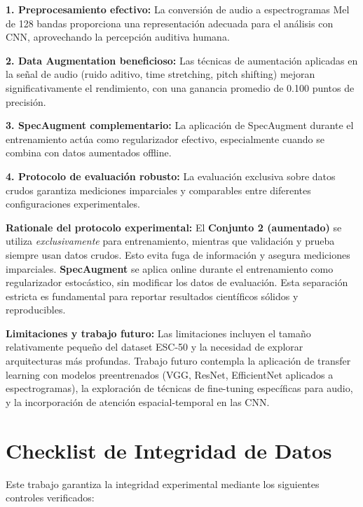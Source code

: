 \documentclass[conference]{IEEEtran}
\begin{document}
\textbf{1. Preprocesamiento efectivo:} La conversión de audio a espectrogramas Mel de 128 bandas proporciona una representación adecuada para el análisis con CNN, aprovechando la percepción auditiva humana.

\textbf{2. Data Augmentation beneficioso:} Las técnicas de aumentación aplicadas en la señal de audio (ruido aditivo, time stretching, pitch shifting) mejoran significativamente el rendimiento, con una ganancia promedio de 0.100 puntos de precisión.

\textbf{3. SpecAugment complementario:} La aplicación de SpecAugment durante el entrenamiento actúa como regularizador efectivo, especialmente cuando se combina con datos aumentados offline.

\textbf{4. Protocolo de evaluación robusto:} La evaluación exclusiva sobre datos crudos garantiza mediciones imparciales y comparables entre diferentes configuraciones experimentales.

\textbf{Rationale del protocolo experimental:} El \textbf{Conjunto 2 (aumentado)} se utiliza \emph{exclusivamente} para entrenamiento, mientras que validación y prueba siempre usan datos crudos. Esto evita fuga de información y asegura mediciones imparciales. \textbf{SpecAugment} se aplica online durante el entrenamiento como regularizador estocástico, sin modificar los datos de evaluación. Esta separación estricta es fundamental para reportar resultados científicos sólidos y reproducibles.

\textbf{Limitaciones y trabajo futuro:} Las limitaciones incluyen el tamaño relativamente pequeño del dataset ESC-50 y la necesidad de explorar arquitecturas más profundas. Trabajo futuro contempla la aplicación de transfer learning con modelos preentrenados (VGG, ResNet, EfficientNet aplicados a espectrogramas), la exploración de técnicas de fine-tuning específicas para audio, y la incorporación de atención espacial-temporal en las CNN.

\section*{Checklist de Integridad de Datos}

Este trabajo garantiza la integridad experimental mediante los siguientes controles verificados:
\end{document}
